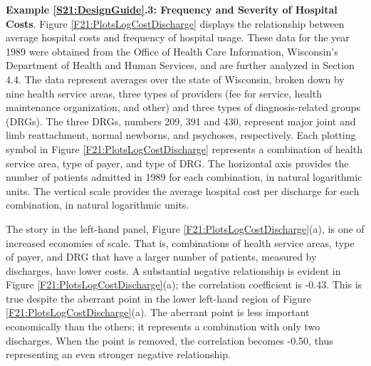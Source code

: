 \textbf{Example \ref{S21:DesignGuide}.3: Frequency and Severity of
Hospital Costs}. Figure \ref{F21:PlotsLogCostDischarge} displays the
relationship between average hospital costs and frequency of
hospital usage. These data for the year 1989 were obtained from the
Office of Health Care Information, Wisconsin's Department of Health
and Human Services, and are further analyzed in Section 4.4. The
data represent averages over the state of Wisconsin, broken down by
nine health service areas, three types of providers (fee for
service, health maintenance organization, and other) and three types
of diagnosis-related groups (DRGs). The three DRGs, numbers 209, 391
and 430, represent major joint and limb reattachment, normal
newborns, and psychoses, respectively. Each plotting symbol in
Figure \ref{F21:PlotsLogCostDischarge} represents a combination of
health service area, type of payer, and type of DRG. The horizontal
axis provides the number of patients admitted in 1989 for each
combination, in natural logarithmic units. The vertical scale
provides the average hospital cost per discharge for each
combination, in natural logarithmic units.

The story in the left-hand panel, Figure
\ref{F21:PlotsLogCostDischarge}(a), is one of increased economies of
scale. That is, combinations of health service areas, type of payer,
and DRG that have a larger number of patients, measured by
discharges, have lower costs. A substantial negative relationship is
evident in Figure \ref{F21:PlotsLogCostDischarge}(a); the
correlation coefficient is -0.43. This is true despite the aberrant
point in the lower left-hand region of Figure
\ref{F21:PlotsLogCostDischarge}(a). The aberrant point is less
important economically than the others; it represents a combination
with only two discharges. When the point is removed, the correlation
becomes -0.50, thus representing an even stronger negative
relationship.


